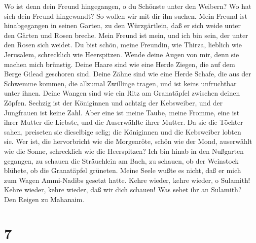  Wo ist denn dein Freund hingegangen, o du Schönste unter
den Weibern? Wo hat sich dein Freund hingewandt? So wollen wir mit dir
ihn suchen.  Mein Freund ist hinabgegangen in seinen Garten,
zu den Würzgärtlein, daß er sich weide unter den Gärten und Rosen
breche.  Mein Freund ist mein, und ich bin sein, der unter
den Rosen sich weidet.  Du bist schön, meine Freundin, wie
Thirza, lieblich wie Jerusalem, schrecklich wie Heerspitzen.
 Wende deine Augen von mir, denn sie machen mich brünstig.
Deine Haare sind wie eine Herde Ziegen, die auf dem Berge Gilead
geschoren sind.  Deine Zähne sind wie eine Herde Schafe, die
aus der Schwemme kommen, die allzumal Zwillinge tragen, und ist keins
unfruchtbar unter ihnen.  Deine Wangen sind wie ein Ritz am
Granatäpfel zwischen deinen Zöpfen.  Sechzig ist der
Königinnen und achtzig der Kebsweiber, und der Jungfrauen ist keine
Zahl.  Aber eine ist meine Taube, meine Fromme, eine ist
ihrer Mutter die Liebste, und die Auserwählte ihrer Mutter. Da sie die
Töchter sahen, preiseten sie dieselbige selig; die Königinnen und die
Kebsweiber lobten sie.  Wer ist, die hervorbricht wie die
Morgenröte, schön wie der Mond, auserwählt wie die Sonne, schrecklich
wie die Heerspitzen?  Ich bin hinab in den Nußgarten
gegangen, zu schauen die Sträuchlein am Bach, zu schauen, ob der
Weinstock blühete, ob die Granatäpfel grüneten.  Meine
Seele wußte es nicht, daß er mich zum Wagen Ammi-Nadibs gesetzt hatte.
 Kehre wieder, kehre wieder, o Sulamith! Kehre wieder,
kehre wieder, daß wir dich schauen! Was sehet ihr an Sulamith? Den
Reigen zu Mahanaim.

\hypertarget{section-6}{%
\section{7}\label{section-6}}

